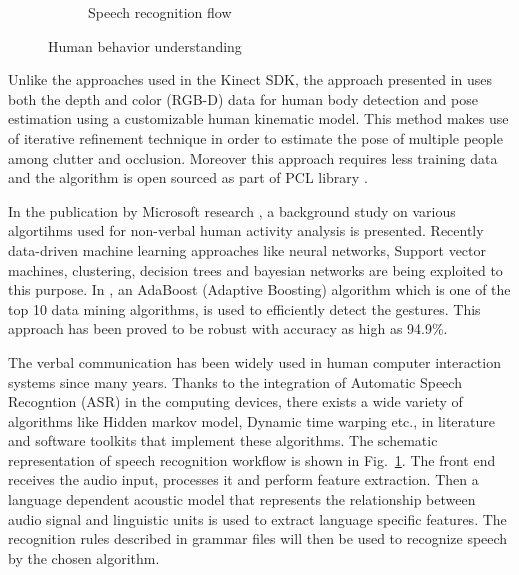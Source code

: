 \begin{figure}
\begin{subfigure}[t]{0.48\textwidth}
\caption[Speech recognition flow]{Speech recognition flow}
\label{fig:speech_recog}
\end{subfigure}
\caption[Human behavior understanding]{Human behavior understanding}
\label{fig:behavior_understand}
\end{figure} 
Unlike the approaches used in the Kinect SDK, the approach presented in \cite{buys2014adaptable} uses both the depth and color (RGB-D) data for human body detection and pose estimation using a customizable human kinematic model. This method makes use of iterative refinement technique in order to estimate the pose of multiple people among clutter and occlusion. Moreover this approach requires less training data and the algorithm is open sourced as part of PCL library \cite{rusu20113d}.  

In the publication by Microsoft research \cite{han2013enhanced}, a background study on various algortihms used for non-verbal human activity analysis is presented. Recently \cite{KinectSDK2014} data-driven machine learning approaches like neural networks, Support vector machines, clustering, decision trees and bayesian networks are being exploited to this purpose. In \cite{KinectSDK2014}, an AdaBoost (Adaptive Boosting) algorithm \cite{freund1997decision} which is one of the top 10 data mining algorithms, is used to efficiently detect the gestures. This approach has been proved to be robust with accuracy as high as 94.9\%. 

The verbal communication has been widely used in human computer interaction systems since many years. Thanks to the integration of Automatic Speech Recogntion (ASR) in the computing devices, there exists a wide variety of algorithms like Hidden markov model, Dynamic time warping etc., in literature \cite{reddy1976speech} \cite{lippmann1997speech} and software toolkits \cite{SpeechSdk} that implement these algorithms. The schematic representation of speech recognition workflow is shown in Fig.~\ref{fig:speech_recog}. The front end receives the audio input, processes it and perform feature extraction. Then a language dependent acoustic model that represents the relationship between audio signal and linguistic units is used to extract language specific features. The recognition rules described in grammar files \cite{Hunt:04:SRG} will then be used to recognize speech by the chosen algorithm.

